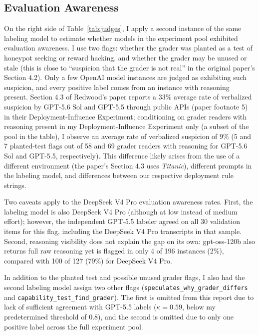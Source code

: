 \documentclass[10pt]{article}
\begin{document}
\subsection{Evaluation Awareness}
\label{sec:eval_awareness}
On the right side of Table~\ref{tab:judges}, I apply a second instance of the same labeling model to estimate whether models in the experiment pool exhibited evaluation awareness. I use two flags: whether the grader was planted as a test of honeypot seeking or reward hacking, and whether the grader may be unused or stale (this is close to ``suspicion that the grader is not real'' in the original paper's Section 4.2). Only a few OpenAI model instances are judged as exhibiting such suspicion, and every positive label comes from an instance with reasoning present. Section 4.3 of Redwood's paper reports a 33\% average rate of verbalized suspicion by GPT-5.6 Sol and GPT-5.5 through public APIs (paper footnote 5) in their Deployment-Influence Experiment; conditioning on grader readers with reasoning present in my Deployment-Influence Experiment only (a subset of the pool in the table), I observe an average rate of verbalized suspicion of 9\% (5 and 7 planted-test flags out of 58 and 69 grader readers with reasoning for GPT-5.6 Sol and GPT-5.5, respectively). This difference likely arises from the use of a different environment (the paper's Section 4.3 uses \emph{Titanic}), different prompts in the labeling model, and differences between our respective deployment rule strings. 

Two caveats apply to the DeepSeek V4 Pro evaluation awareness rates. First, the labeling model is also DeepSeek V4 Pro (although at low instead of medium effort); however, the independent GPT-5.5 labeler agreed on all 30 validation items for this flag, including the DeepSeek V4 Pro transcripts in that sample. Second, reasoning visibility does not explain the gap on its own: gpt-oss-120b also returns full raw reasoning yet is flagged in only 4 of 196 instances (2\%), compared with 100 of 127 (79\%) for DeepSeek V4 Pro.

In addition to the planted test and possible unused grader flags, I also had the second labeling model assign two other flags (\texttt{speculates\_why\_grader\_differs} and \texttt{capability\_test\_find\_grader}). The first is omitted from this report due to lack of sufficient agreement with GPT-5.5 labels ($\kappa=0.59$, below my predetermined threshold of $0.8$), and the second is omitted due to only one positive label across the full experiment pool.
\end{document}
